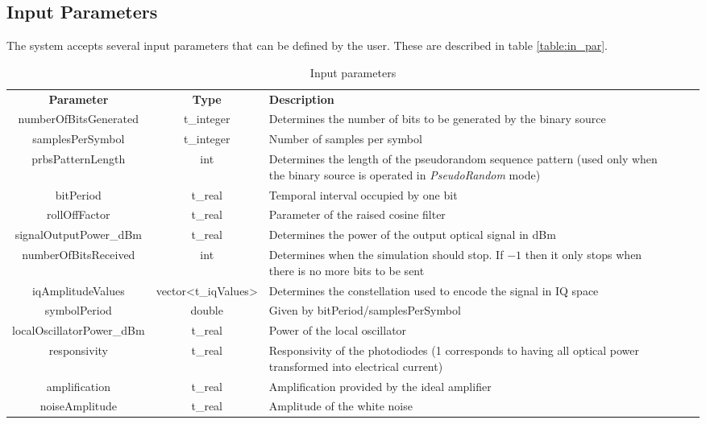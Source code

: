 \subsection*{Input Parameters}

The system accepts several input parameters that can be defined by the user. These are described in table \ref{table:in_par}.

\begin{table}[]
	\centering
	\caption{Input parameters}
	\begin{tabular}{|c|c|p{70mm}|ccp{70mm}}
		\cline{1-3}
		\textbf{Parameter} & \textbf{Type} & \textbf{Description} &    \\ \cline{1-3}
		numberOfBitsGenerated & t\_integer & Determines the number of bits to be generated by the binary source  &    \\ \cline{1-3}
		samplesPerSymbol & t\_integer & Number of samples per symbol &    \\ \cline{1-3}
		prbsPatternLength & int & Determines the length of the pseudorandom sequence pattern (used only when the binary source is operated in \textit{PseudoRandom} mode) &    \\ \cline{1-3}
		bitPeriod & t\_real & Temporal interval occupied by one bit &    \\ \cline{1-3}
		rollOffFactor & t\_real & Parameter of the raised cosine filter &    \\ \cline{1-3}
		signalOutputPower\_dBm & t\_real & Determines the power of the output optical signal in dBm &  \\ \cline{1-3}
		numberOfBitsReceived & int &   Determines when the simulation should stop. If $-1$ then it only stops when there is no more bits to be sent&   \\ \cline{1-3}
		iqAmplitudeValues & vector<t\_iqValues> & Determines the constellation used to encode the signal in IQ space &    \\ \cline{1-3}
		symbolPeriod & double & Given by bitPeriod/samplesPerSymbol &    \\ \cline{1-3}
		localOscillatorPower\_dBm & t\_real & Power of the local oscillator &    \\ \cline{1-3}
		responsivity & t\_real & Responsivity of the photodiodes (1 corresponds to having all optical power transformed into electrical current) &    \\ \cline{1-3}
		amplification & t\_real & Amplification provided by the ideal amplifier &    \\ \cline{1-3}
		noiseAmplitude & t\_real & Amplitude of the white noise &    \\ \cline{1-3}

\end{tabular}
\end{table}
